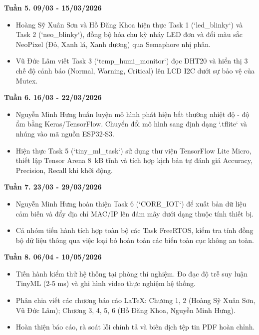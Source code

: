 \vspace{-.2cm}
\textbf{Tuần 5. 09/03 - 15/03/2026}
\begin{itemize}
    \vspace{-.4cm}
    \item [-] Hoàng Sỹ Xuân Sơn và Hồ Đăng Khoa hiện thực Task 1 (`led_blinky`) và Task 2 (`neo_blinky`), đồng bộ hóa chu kỳ nháy LED đơn và đổi màu sắc NeoPixel (Đỏ, Xanh lá, Xanh dương) qua Semaphore nhị phân.
    \vspace{-.4cm}
    \item [-] Vũ Đức Lâm viết Task 3 (`temp_humi_monitor`) đọc DHT20 và hiển thị 3 chế độ cảnh báo (Normal, Warning, Critical) lên LCD I2C dưới sự bảo vệ của Mutex.
\end{itemize}
\vspace{-.2cm}
\textbf{Tuần 6. 16/03 - 22/03/2026}
\begin{itemize}
    \vspace{-.4cm}
    \item [-] Nguyễn Minh Hưng huấn luyện mô hình phát hiện bất thường nhiệt độ - độ ẩm bằng Keras/TensorFlow. Chuyển đổi mô hình sang định dạng `.tflite` và nhúng vào mã nguồn ESP32-S3.
    \vspace{-.4cm}
    \item [-] Hiện thực Task 5 (`tiny_ml_task`) sử dụng thư viện TensorFlow Lite Micro, thiết lập Tensor Arena 8~kB tĩnh và tích hợp kịch bản tự đánh giá Accuracy, Precision, Recall khi khởi động.
\end{itemize}
\vspace{-.2cm}
\textbf{Tuần 7. 23/03 - 29/03/2026}
\begin{itemize}
    \vspace{-.4cm}
    \item [-] Nguyễn Minh Hưng hoàn thiện Task 6 (`CORE_IOT`) để xuất bản dữ liệu cảm biến và đẩy địa chỉ MAC/IP lên đám mây dưới dạng thuộc tính thiết bị.
    \vspace{-.4cm}
    \item [-] Cả nhóm tiến hành tích hợp toàn bộ các Task FreeRTOS, kiểm tra tính đồng bộ dữ liệu thông qua việc loại bỏ hoàn toàn các biến toàn cục không an toàn.
\end{itemize}
\vspace{-.2cm}
\textbf{Tuần 8. 06/04 - 10/05/2026}
\begin{itemize}
    \vspace{-.4cm}
    \item [-] Tiến hành kiểm thử hệ thống tại phòng thí nghiệm. Đo đạc độ trễ suy luận TinyML (2-5 ms) và ghi hình video thực nghiệm hệ thống.
    \vspace{-.4cm}
    \item [-] Phân chia viết các chương báo cáo LaTeX: Chương 1, 2 (Hoàng Sỹ Xuân Sơn, Vũ Đức Lâm); Chương 3, 4, 5, 6 (Hồ Đăng Khoa, Nguyễn Minh Hưng).
    \vspace{-.4cm}
    \item [-] Hoàn thiện báo cáo, rà soát lỗi chính tả và biên dịch tệp tin PDF hoàn chỉnh.
\end{itemize}